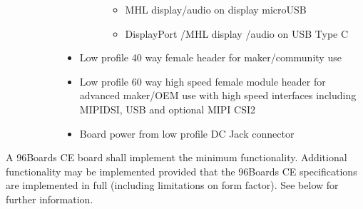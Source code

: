 \documentclass[a4paper,10pt,oneside,english]{sphinxmanual}
\begin{document}
\begin{description}
\begin{description}
\begin{itemize}
\begin{description}
\begin{itemize}
\item {} 
\sphinxAtStartPar
MHL display/audio on display microUSB

\item {} 
\sphinxAtStartPar
DisplayPort /MHL display /audio on USB Type C

\end{itemize}

\end{description}

\item {} 
\sphinxAtStartPar
Low profile 40 way female header for maker/community use

\item {} 
\sphinxAtStartPar
Low profile 60 way high speed female module header for advanced maker/OEM use with high speed interfaces including MIPI\sphinxhyphen{}DSI, USB and optional MIPI CSI\sphinxhyphen{}2

\item {} 
\sphinxAtStartPar
Board power from low profile DC Jack connector

\end{itemize}

\end{description}

\end{description}

\sphinxAtStartPar
A 96Boards CE board shall implement the minimum functionality. Additional functionality may be implemented provided that the 96Boards CE specifications are implemented in full (including limitations on form factor).  See below for further information.
\end{document}
